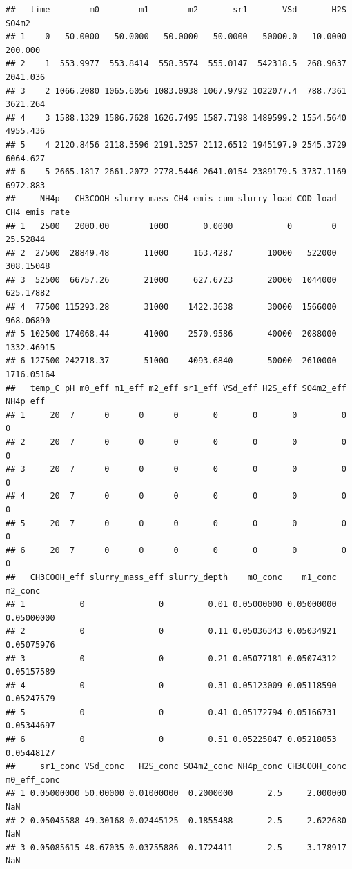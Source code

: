 \documentclass[
]{article}
\begin{document}
\begin{verbatim}
##   time        m0        m1        m2       sr1       VSd       H2S    SO4m2
## 1    0   50.0000   50.0000   50.0000   50.0000   50000.0   10.0000  200.000
## 2    1  553.9977  553.8414  558.3574  555.0147  542318.5  268.9637 2041.036
## 3    2 1066.2080 1065.6056 1083.0938 1067.9792 1022077.4  788.7361 3621.264
## 4    3 1588.1329 1586.7628 1626.7495 1587.7198 1489599.2 1554.5640 4955.436
## 5    4 2120.8456 2118.3596 2191.3257 2112.6512 1945197.9 2545.3729 6064.627
## 6    5 2665.1817 2661.2072 2778.5446 2641.0154 2389179.5 3737.1169 6972.883
##     NH4p   CH3COOH slurry_mass CH4_emis_cum slurry_load COD_load CH4_emis_rate
## 1   2500   2000.00        1000       0.0000           0        0      25.52844
## 2  27500  28849.48       11000     163.4287       10000   522000     308.15048
## 3  52500  66757.26       21000     627.6723       20000  1044000     625.17882
## 4  77500 115293.28       31000    1422.3638       30000  1566000     968.06890
## 5 102500 174068.44       41000    2570.9586       40000  2088000    1332.46915
## 6 127500 242718.37       51000    4093.6840       50000  2610000    1716.05164
##   temp_C pH m0_eff m1_eff m2_eff sr1_eff VSd_eff H2S_eff SO4m2_eff NH4p_eff
## 1     20  7      0      0      0       0       0       0         0        0
## 2     20  7      0      0      0       0       0       0         0        0
## 3     20  7      0      0      0       0       0       0         0        0
## 4     20  7      0      0      0       0       0       0         0        0
## 5     20  7      0      0      0       0       0       0         0        0
## 6     20  7      0      0      0       0       0       0         0        0
##   CH3COOH_eff slurry_mass_eff slurry_depth    m0_conc    m1_conc    m2_conc
## 1           0               0         0.01 0.05000000 0.05000000 0.05000000
## 2           0               0         0.11 0.05036343 0.05034921 0.05075976
## 3           0               0         0.21 0.05077181 0.05074312 0.05157589
## 4           0               0         0.31 0.05123009 0.05118590 0.05247579
## 5           0               0         0.41 0.05172794 0.05166731 0.05344697
## 6           0               0         0.51 0.05225847 0.05218053 0.05448127
##     sr1_conc VSd_conc   H2S_conc SO4m2_conc NH4p_conc CH3COOH_conc m0_eff_conc
## 1 0.05000000 50.00000 0.01000000  0.2000000       2.5     2.000000         NaN
## 2 0.05045588 49.30168 0.02445125  0.1855488       2.5     2.622680         NaN
## 3 0.05085615 48.67035 0.03755886  0.1724411       2.5     3.178917         NaN

\end{verbatim}
\end{document}
